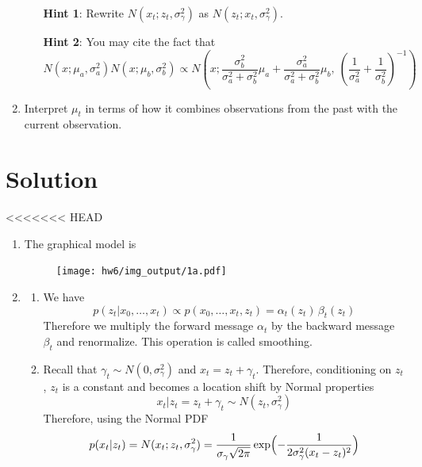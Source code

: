 \documentclass[submit]{../harvardml}
\newcommand{\siggam}{\sigma_{\gamma}}
\newenvironment{solution}
  {\color{blue}\section*{Solution}}
{}
\begin{document}
\begin{problem}
\begin{enumerate}
\begin{enumerate}
      \textbf{Hint 1}: Rewrite $N(x_t; z_t, \siggam^2)$ as $N(z_t; x_t, \siggam^2)$.
      
      \textbf{Hint 2}: You may cite the fact that 
      \[N(x; \mu_a, \sigma^2_a)N(x; \mu_b, \sigma^2_b) \propto N\left(x; \frac{\sigma^2_b}{\sigma^2_a+\sigma^2_b}\mu_a + \frac{\sigma^2_a}{\sigma^2_a+\sigma^2_b}\mu_b, \ \left(\frac{1}{\sigma^2_a} + \frac{1}{\sigma^2_b}\right)^{-1}\right)\]
  \end{enumerate}
  \item Interpret $\mu_t$ in terms of how it combines observations from the past with the current observation. 
\end{enumerate}
\end{problem}


\newpage

\begin{solution}
<<<<<<< HEAD
    \begin{enumerate}
        \item The graphical model is 
        \begin{figure}[H]
            \centering
            \texttt{[image: hw6/img\_output/1a.pdf]}
        \end{figure}

        \item 
            \begin{enumerate}
                \item We have
                $$p(z_t| x_0,\dots,x_t)\propto p(x_0,\dots,x_t, z_t) =  \alpha_t(z_t)\,\beta_t(z_t)$$
                Therefore we multiply the forward message $\alpha_t$ by the backward message $\beta_t$ and renormalize. This operation is called smoothing.

                \item Recall that $\gamma_t \sim N(0, \siggam^2)$ and $x_t = z_t + \gamma_t$. Therefore, conditioning on $z_t$, $z_t$ is a constant and becomes a location shift by Normal properties
                $$x_t | z_t = z_t + \gamma_t \sim N(z_t, \sigma^2_\gamma)$$
                Therefore, using the Normal PDF
                $$p(x_t| z_t) = N(x_t; z_t, \siggam^2) = \frac{1}{\siggam\sqrt{2\pi}} \exp\Bigl(-\frac{1}{2\siggam^2 (x_t - z_t)^2}\Bigr)$$


\end{enumerate}
\end{enumerate}
\end{solution}
\end{document}
